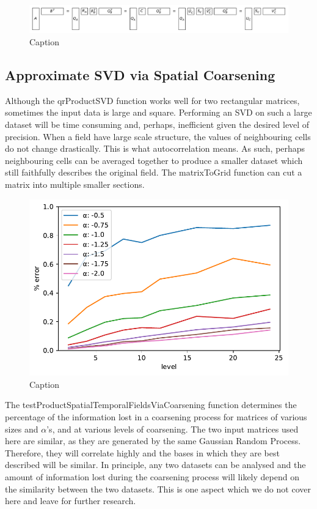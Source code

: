 \documentclass{acm_proc_article-sp}
\begin{document}
\begin{figure}[h]
\begin{center}
\includegraphics[width=\columnwidth]{Results/qrProductSVD.pdf}
\caption[Small caption]{Caption}
\label{fig:qrProductSVD}
\end{center}
\end{figure}
\subsection{Approximate SVD via Spatial Coarsening}
\label{sec:Techniques Approximate SVD via Spatial Coarsening}

Although the qrProductSVD function works well for two rectangular matrices, sometimes the input data is large and square. Performing an SVD on such a large dataset will be time consuming and, perhaps, inefficient given the desired level of precision. When a field have large scale structure, the values of neighbouring cells do not change drastically. This is what autocorrelation means. As such, perhaps neighbouring cells can be averaged together to produce a smaller dataset which still faithfully describes the original field. The matrixToGrid function can cut a matrix into multiple smaller sections.

\begin{figure}[h]
\begin{center}
\includegraphics[width=0.8\columnwidth]{Results/plotSingleSpatialFieldViaCoarsening.pdf}
\caption[Small caption]{Caption}
\label{fig:plotSingleSpatialFieldViaCoarsening}
\end{center}
\end{figure}
The testProductSpatialTemporalFieldsViaCoarsening function determines the percentage of the information lost in a coarsening process for matrices of various sizes and $\alpha$'s, and at various levels of coarsening. The two input matrices used here are similar, as they are generated by the same Gaussian Random Process. Therefore, they will correlate highly and the bases in which they are best described will be similar. In principle, any two datasets can be analysed and the amount of information lost during the coarsening process will likely depend on the similarity between the two datasets. This is one aspect which we do not cover here and leave for further research.
\end{document}
